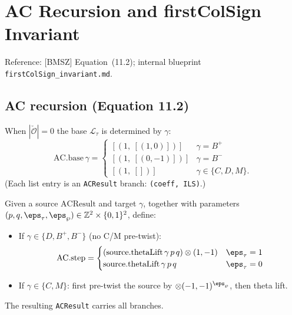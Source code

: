 
\chapter{AC Recursion and firstColSign Invariant}
\label{chap:ac}

Reference: [BMSZ] Equation~(11.2); internal blueprint
\texttt{firstColSign\_invariant.md}.

\section{AC recursion (Equation 11.2)}

\begin{definition}
  \label{def:AC_base}
  \leanok
  When $|\check{\mathcal{O}}| = 0$ the base $\mathcal{L}_\tau$ is determined by $\gamma$:
  \[
    \mathrm{AC.base}\,\gamma = \begin{cases}
      [(1,\ [(1, 0)])] & \gamma = B^+ \\
      [(1,\ [(0, -1)])] & \gamma = B^- \\
      [(1,\ [])] & \gamma \in \{C, D, M\}.
    \end{cases}
  \]
  (Each list entry is an \texttt{ACResult} branch: \texttt{(coeff, ILS)}.)
\end{definition}

\begin{definition}
  \label{def:AC_step}
  \leanok
  Given a source $\mathrm{ACResult}$ and target $\gamma$, together with parameters
  $(p, q, \eps_\tau, \eps_\wp) \in \mathbb{Z}^2 \times \{0, 1\}^2$, define:
  \begin{itemize}
    \item If $\gamma \in \{D, B^+, B^-\}$ (no C/M pre-twist):
    \[
      \mathrm{AC.step} =
      \begin{cases}
        (\mathrm{source.thetaLift}\,\gamma\,p\,q)\otimes(1, -1) & \eps_\tau = 1 \\
        \mathrm{source.thetaLift}\,\gamma\,p\,q & \eps_\tau = 0
      \end{cases}
    \]
    \item If $\gamma \in \{C, M\}$: first pre-twist the source by $\otimes(-1, -1)^{\eps_\wp}$, then theta lift.
  \end{itemize}
  The resulting \texttt{ACResult} carries all branches.
\end{definition}

